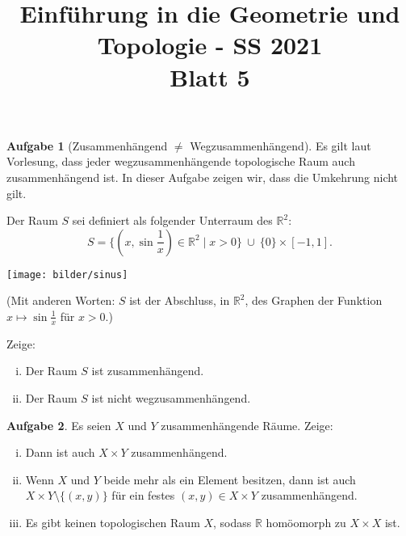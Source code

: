 \documentclass{article}
\title{Einführung in die Geometrie und Topologie - SS 2021\\
Blatt 5}
\date{}
\theoremstyle{definition}
\newtheorem{aufgabe}{Aufgabe}
\theoremstyle{remark}
\begin{document}
\maketitle
\thispagestyle{fancy}
\cfoot{}
\renewcommand{\headrulewidth}{0pt}
\renewcommand{\footrulewidth}{0.4pt}

\begin{aufgabe}[Zusammenhängend $\neq$ Wegzusammenhängend]
Es gilt laut Vorlesung, dass jeder wegzusammenhängende topologische Raum auch zusammenhängend ist. In dieser Aufgabe zeigen wir, dass die Umkehrung nicht gilt.
 
Der Raum $S$ sei definiert als folgender Unterraum
des $\mathbb{R}^2$:
\[S = \Big\{ \left(x,\sin \frac{1}{x}\right) \in \mathbb{R}^2 \mid x > 0\Big\}
\ \cup \ \{0\} \times [-1,1].\]

\hspace*{-1cm}
\texttt{[image: bilder/sinus]}

(Mit anderen Worten: $S$ ist der Abschluss, in $\mathbb{R}^2$, des Graphen
der Funktion $x \mapsto \sin \frac{1}{x}$ für $x > 0$.)

Zeige: 
\begin{enumerate}[i)]
\item Der Raum $S$ ist zusammenhängend.
\item Der Raum $S$ ist nicht wegzusammenhängend.
\end{enumerate}
\end{aufgabe}

\begin{aufgabe}
Es seien $X$ und $Y$ zusammenhängende Räume. Zeige:
\begin{enumerate}[i)]
	\item Dann ist auch $X\times Y$ zusammenhängend.
	\item Wenn $X$ und $Y$ beide mehr als ein Element besitzen, dann ist auch $X\times Y\setminus \{(x,y)\}$ für ein festes $(x,y)\in X\times Y$ zusammenhängend.
	\item Es gibt keinen topologischen Raum $X$, sodass $\mathbb R$ homöomorph zu $X\times X$ ist.
\end{enumerate}
\end{aufgabe}
\end{document}
